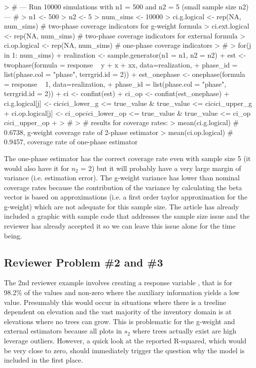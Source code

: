 \documentclass{article}
\begin{document}
\begin{small}
\begin{Schunk}
\begin{Sinput}
> # --- Run 10000 simulations with n1 = 500 and n2 = 5 (small sample size n2) --- #
> n1 <- 500
> n2 <- 5
> num_sims <- 10000
> ci.g.logical <- rep(NA, num_sims)   # two-phase coverage indicators for g-weight formula
> ci.ext.logical <- rep(NA, num_sims) # two-phase coverage indicators for external formula
> ci.op.logical <- rep(NA, num_sims)  # one-phase coverage indicators
> #
> for(j in 1: num_sims){
+   realization <- sample.generator(n1 = n1, n2 = n2)
+   est <- twophase(formula = response ~ y + x + xx, data=realization, 
+                   phase_id = list(phase.col = "phase", terrgrid.id = 2))
+   est_onephase <- onephase(formula = response ~ 1, data=realization, 
+                            phase_id = list(phase.col = "phase", terrgrid.id = 2))
+   ci <- confint(est)
+   ci_op <- confint(est_onephase)
+   ci.g.logical[j] <- ci$ci$ci_lower_g <= true_value & true_value <= ci$ci$ci_upper_g
+   ci.op.logical[j] <- ci_op$ci$ci_lower_op <= true_value & true_value <= ci_op$ci$ci_upper_op
+ }
> #
> # results for coverage rates:
> mean(ci.g.logical)   # 0.6738, g-weight coverage rate of 2-phase estimator
> mean(ci.op.logical)  # 0.9457, coverage rate of one-phase estimator
\end{Sinput}
\end{Schunk}
\end{small}

The one-phase estimator has the correct coverage rate even with sample size 5 (it would also have it for $n_2$ = 2) but it will probably have a very large margin of variance (i.e. estimation error). The g-weight variance has lower than nominal coverage rates because the contribution of the variance by calculating the beta vector is based on approximations (i.e. a first order taylor approximation for the g-weight) which are not adequate for this sample size.  The article has already included a graphic with sample code that addresses the sample size issue and the reviewer has already accepted it so we can leave this issue alone for the time being.


\subsection*{Reviewer Problem \#2 and \#3}

The 2nd reviewer example involves creating a response variable , that is  for 98.2\% of the values and non-zero where the auxiliary information yields a low value.  Presumably this would occur in situations where there is a treeline dependent on elevation and the vast majority of the inventory domain is at elevations where no trees can grow.  This is problematic for the g-weight and external estimators because all plots in $s_2$ where trees actually exist are high leverage outliers. However, a quick look at the reported R-squared, which would be very close to zero, should immediately trigger the  question why the model is included in the first place.\\
\end{document}
